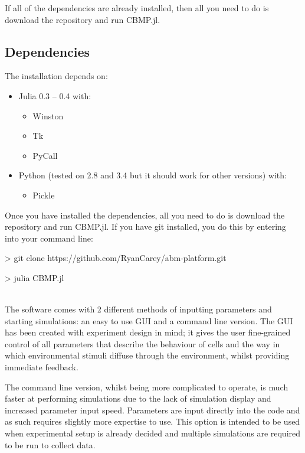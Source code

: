 \documentclass[12pt]{article}
\begin{document}
If all of the dependencies are already installed, then all you need to 
do is download the repository and run CBMP.jl.

\subsection{Dependencies}

The installation depends on:

\begin{itemize}
\item Julia 0.3 -- 0.4 with:
\begin{itemize}
\item Winston
\item Tk
\item PyCall
\end{itemize}
\item Python (tested on 2.8 and 3.4 but it should work for other 
versions) with:
\begin{itemize}
\item Pickle
\end{itemize}
\end{itemize}

Once you have installed the dependencies, all you need to do is download 
the repository and run CBMP.jl. If you have git installed, you do this 
by entering into your command line: \\

{\fontsize{10pt}{11pt} \ttfamily 
> git clone https://github.com/RyanCarey/abm-platform.git

> julia CBMP.jl} \\

The software comes with 2 different methods of inputting parameters and 
starting simulations: an easy to use GUI and a command line version. The 
GUI has been created with experiment design in mind; it gives the user 
fine-grained control of all parameters that describe the behaviour of 
cells and the way in which environmental stimuli diffuse through the 
environment, whilst providing immediate feedback.

The command line version, whilst being more complicated to operate, is 
much faster at performing simulations due to the lack of simulation 
display and increased parameter input speed. Parameters are input 
directly into the code and as such requires slightly more expertise to 
use. This option is intended to be used when experimental setup is 
already decided and multiple simulations are required to be run to 
collect data.
\end{document}
